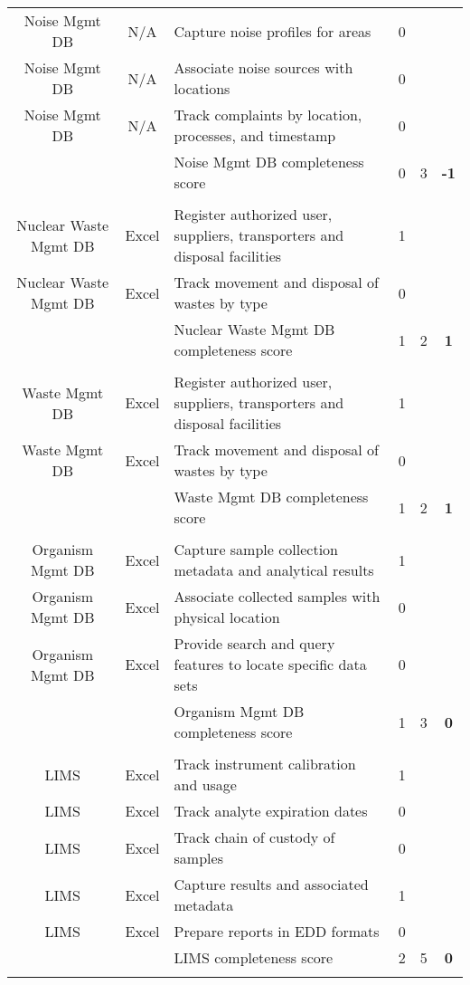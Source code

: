 \begin{table}[H]
{\begin{tabular}{@{}cclccc@{}}
Noise Mgmt DB & N/A & Capture noise profiles for areas & 0 &  &  \\
Noise Mgmt DB & N/A & Associate noise sources with locations & 0 &  &  \\
Noise Mgmt DB & N/A & Track complaints by location, processes, and timestamp & 0 &  &  \\
 &  & Noise Mgmt DB completeness score & 0 & 3 & \textbf{-1} \\
 &  &  &  &  &  \\
Nuclear Waste Mgmt DB & Excel & Register authorized user, suppliers, transporters and disposal facilities & 1 &  &  \\
Nuclear Waste Mgmt DB & Excel & Track movement and disposal of wastes by type & 0 &  &  \\
 &  & Nuclear Waste Mgmt DB completeness score & 1 & 2 & \textbf{1} \\
 &  &  &  &  &  \\
Waste Mgmt DB & Excel & Register authorized user, suppliers, transporters and disposal facilities & 1 &  &  \\
Waste Mgmt DB & Excel & Track movement and disposal of wastes by type & 0 &  &  \\
 &  & Waste Mgmt DB completeness score & 1 & 2 & \textbf{1} \\
 &  &  &  &  &  \\
Organism Mgmt DB & Excel & Capture sample collection metadata and analytical results & 1 &  &  \\
Organism Mgmt DB & Excel & Associate collected samples with physical location & 0 &  &  \\
Organism Mgmt DB & Excel & Provide search and query features to locate specific data sets & 0 &  &  \\
 &  & Organism Mgmt DB completeness score & 1 & 3 & \textbf{0} \\
 &  &  &  &  &  \\
LIMS & Excel & Track instrument calibration and usage & 1 &  &  \\
LIMS & Excel & Track analyte expiration dates & 0 &  &  \\
LIMS & Excel & Track chain of custody of samples & 0 &  &  \\
LIMS & Excel & Capture results and associated metadata & 1 &  &  \\
LIMS & Excel & Prepare reports in EDD formats & 0 &  &  \\
 &  & LIMS completeness score & 2 & 5 & \textbf{0} \\
 &  &  &  &  &  \\

\end{tabular}}
\end{table}

